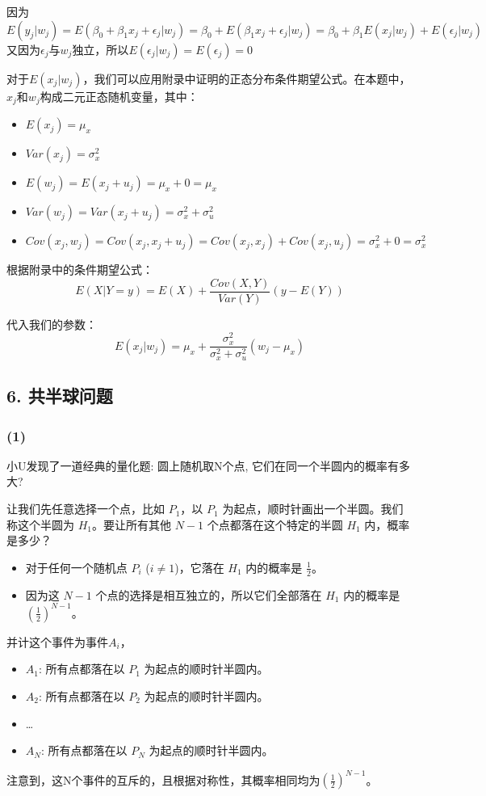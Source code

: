 \documentclass[UTF8]{ctexart}
\begin{document}
因为$E(y_{j}|w_{j})=E(\beta_{0}+\beta_{1}x_{j}+\epsilon_{j}|w_{j})=\beta_{0}+E(\beta_{1}x_{j}+\epsilon_{j}|w_{j})=\beta_{0}+\beta_{1}E(x_{j}|w_{j})+E(\epsilon_{j}|w_{j})$
又因为$\epsilon_{j}$与$w_{j}$独立，所以$E(\epsilon_{j}|w_{j})=E(\epsilon_{j})=0$

对于$E(x_{j}|w_{j})$，我们可以应用附录中证明的正态分布条件期望公式。在本题中，$x_j$和$w_j$构成二元正态随机变量，其中：
\begin{itemize}
    \item $E(x_j) = \mu_x$
    \item $Var(x_j) = \sigma_x^2$
    \item $E(w_j) = E(x_j + u_j) = \mu_x + 0 = \mu_x$
    \item $Var(w_j) = Var(x_j + u_j) = \sigma_x^2 + \sigma_u^2$
    \item $Cov(x_j, w_j) = Cov(x_j, x_j + u_j) = Cov(x_j, x_j) + Cov(x_j, u_j) = \sigma_x^2 + 0 = \sigma_x^2$
\end{itemize}

根据附录中的条件期望公式：
$$E(X|Y=y) = E(X) + \frac{Cov(X,Y)}{Var(Y)}(y - E(Y))$$

代入我们的参数：
$$
E(x_{j}|w_{j}) = \mu_{x} + \frac{\sigma_{x}^{2}}{\sigma_{x}^{2} + \sigma_{u}^{2}}(w_{j} - \mu_{x})
$$
\subsection*{6. 共半球问题}
\subsubsection*{(1)}
小U发现了一道经典的量化题: 圆上随机取N个点, 它们在同一个半圆内的概率有多大?

让我们先任意选择一个点，比如 \(P_1\)，以 $P_1$ 为起点，顺时针画出一个半圆。我们称这个半圆为 $H_1$。要让所有其他 $N-1$ 个点都落在这个特定的半圆 $H_1$ 内，概率是多少？
\begin{itemize}
    \item 对于任何一个随机点 $P_i$ ($i \neq 1$)，它落在 $H_1$ 内的概率是 $\frac{1}{2}$。
    \item 因为这 $N-1$ 个点的选择是相互独立的，所以它们全部落在 $H_1$ 内的概率是 $(\frac{1}{2})^{N-1}$。
\end{itemize}
并计这个事件为事件$A_i$，
\begin{itemize}
    \item $A_1$: 所有点都落在以 $P_1$ 为起点的顺时针半圆内。
    \item $A_2$: 所有点都落在以 $P_2$ 为起点的顺时针半圆内。
    \item \dots
    \item $A_N$: 所有点都落在以 $P_N$ 为起点的顺时针半圆内。
\end{itemize}
注意到，这N个事件的互斥的，且根据对称性，其概率相同均为$(\frac{1}{2})^{N-1}$。
\end{document}
